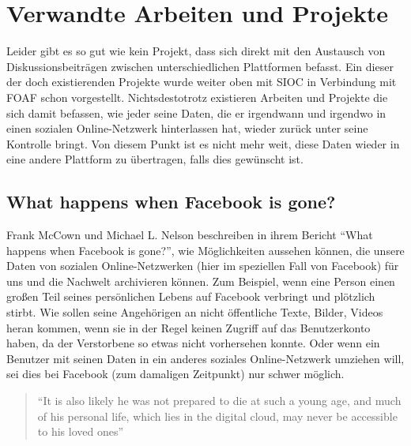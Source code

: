 

\section{Verwandte Arbeiten und Projekte} %
\label{sec:verwandte_arbeiten_und_projekte}

Leider gibt es so gut wie kein Projekt, dass sich direkt mit den Austausch von Diskussionsbeiträgen zwischen unterschiedlichen Plattformen befasst. Ein dieser der doch existierenden Projekte wurde weiter oben mit SIOC in Verbindung mit FOAF schon vorgestellt. Nichtsdestotrotz existieren Arbeiten und Projekte die sich damit befassen, wie jeder seine Daten, die er irgendwann und irgendwo in einen sozialen Online-Netzwerk hinterlassen hat, wieder zurück unter seine Kontrolle bringt. Von diesem Punkt ist es nicht mehr weit, diese Daten wieder in eine andere Plattform zu übertragen, falls dies gewünscht ist.  

\subsection{What happens when Facebook is gone?} %
\label{sub:what_happens_when_facebook_is_gone}

Frank McCown und Michael L. Nelson beschreiben in ihrem Bericht \enquote{What happens when Facebook is gone?}\cite{McCown2009}, wie Möglichkeiten aussehen können, die unsere Daten von sozialen Online-Netzwerken (hier im speziellen Fall von Facebook) für uns und die Nachwelt archivieren können. Zum Beispiel, wenn eine Person einen großen Teil seines persönlichen Lebens auf Facebook verbringt und plötzlich stirbt. Wie sollen seine Angehörigen an nicht öffentliche Texte, Bilder, Videos heran kommen, wenn sie in der Regel keinen Zugriff auf das Benutzerkonto haben, da der Verstorbene so etwas nicht vorhersehen konnte. Oder wenn ein Benutzer mit seinen Daten in ein anderes soziales Online-Netzwerk umziehen will, sei dies bei Facebook (zum damaligen Zeitpunkt) nur schwer möglich.

\begin{quote}
    \enquote{It is also likely he was not prepared to die at such a young age, and much of his personal life, which lies in the digital \grqq cloud\grqq, may never be accessible to his loved ones}
    \cite[S.\,251]{McCown2009}
\end{quote}

